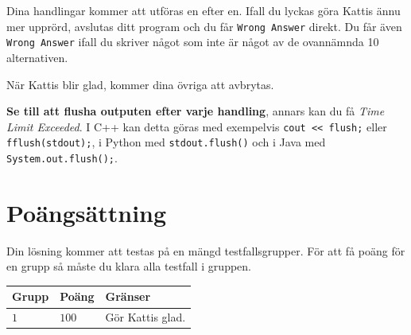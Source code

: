 Dina handlingar kommer att utföras en efter en. Ifall du lyckas göra Kattis ännu mer upprörd, 
avslutas ditt program och du får \texttt{Wrong Answer} direkt. 
Du får även \texttt{Wrong Answer} ifall du skriver något som inte är något av de ovannämnda 10 alternativen.

När Kattis blir glad, kommer dina övriga att avbrytas.

\textbf{Se till att flusha outputen efter varje handling}, annars kan du få \textit{Time Limit Exceeded}.
I C++ kan detta göras med exempelvis \texttt{cout << flush;}
eller \texttt{fflush(stdout);},
i Python med \texttt{stdout.flush()}
och i Java med \texttt{System.out.flush();}.

\section*{Poängsättning}
Din lösning kommer att testas på en mängd testfallsgrupper.
För att få poäng för en grupp så måste du klara alla testfall i gruppen.

\noindent
\begin{tabular}{| l | l | l |}
  \hline
  \textbf{Grupp} & \textbf{Poäng} & \textbf{Gränser} \\ \hline
  $1$   & $100$        & Gör Kattis glad. \\ \hline
\end{tabular}

